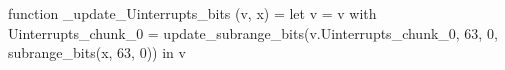 function _update_Uinterrupts_bits (v, x) = let v = { v with Uinterrupts_chunk_0 = update_subrange_bits(v.Uinterrupts_chunk_0, 63, 0, subrange_bits(x, 63, 0)) } in
  v
